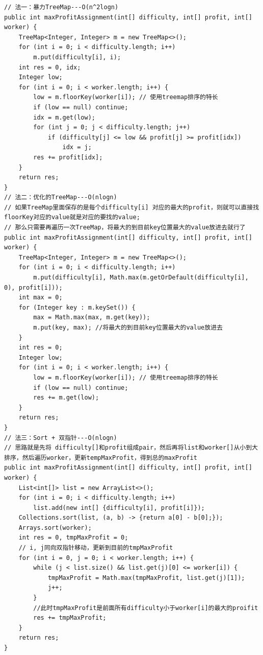\documentclass[9pt, b5paaper]{book}
\begin{document}
\begin{verbatim}
// 法一：暴力TreeMap---O(n^2logn)
public int maxProfitAssignment(int[] difficulty, int[] profit, int[] worker) {
    TreeMap<Integer, Integer> m = new TreeMap<>();
    for (int i = 0; i < difficulty.length; i++) 
        m.put(difficulty[i], i);
    int res = 0, idx;
    Integer low;
    for (int i = 0; i < worker.length; i++) {
        low = m.floorKey(worker[i]); // 使用treemap排序的特长
        if (low == null) continue;
        idx = m.get(low);
        for (int j = 0; j < difficulty.length; j++) 
            if (difficulty[j] <= low && profit[j] >= profit[idx])
                idx = j;
        res += profit[idx];
    }
    return res;
}
// 法二：优化的TreeMap---O(nlogn)
// 如果TreeMap里面保存的是每个difficulty[i] 对应的最大的profit，则就可以直接找floorKey对应的value就是对应的要找的value;
// 那么只需要再遍历一次TreeMap，将最大的到目前key位置最大的value放进去就行了
public int maxProfitAssignment(int[] difficulty, int[] profit, int[] worker) {
    TreeMap<Integer, Integer> m = new TreeMap<>();
    for (int i = 0; i < difficulty.length; i++) 
        m.put(difficulty[i], Math.max(m.getOrDefault(difficulty[i], 0), profit[i]));
    int max = 0;
    for (Integer key : m.keySet()) { 
        max = Math.max(max, m.get(key));
        m.put(key, max); //将最大的到目前key位置最大的value放进去
    }
    int res = 0;
    Integer low;
    for (int i = 0; i < worker.length; i++) {
        low = m.floorKey(worker[i]); // 使用treemap排序的特长
        if (low == null) continue;
        res += m.get(low);
    }
    return res;
}
// 法三：Sort + 双指针---O(nlogn)
// 思路就是先将 difficulty[]和profit组成pair，然后再将list和worker[]从小到大排序，然后遍历worker，更新tempMaxProfit，得到总的maxProfit
public int maxProfitAssignment(int[] difficulty, int[] profit, int[] worker) {
    List<int[]> list = new ArrayList<>();
    for (int i = 0; i < difficulty.length; i++) 
        list.add(new int[] {difficulty[i], profit[i]});
    Collections.sort(list, (a, b) -> {return a[0] - b[0];});
    Arrays.sort(worker);
    int res = 0, tmpMaxProfit = 0;
    // i, j同向双指针移动，更新到目前的tmpMaxProfit
    for (int i = 0, j = 0; i < worker.length; i++) {
        while (j < list.size() && list.get(j)[0] <= worker[i]) {
            tmpMaxProfit = Math.max(tmpMaxProfit, list.get(j)[1]);
            j++;
        }
        //此时tmpMaxProfit是前面所有difficulty小于worker[i]的最大的proifit
        res += tmpMaxProfit;
    }
    return res;
}
\end{verbatim}
\end{document}
